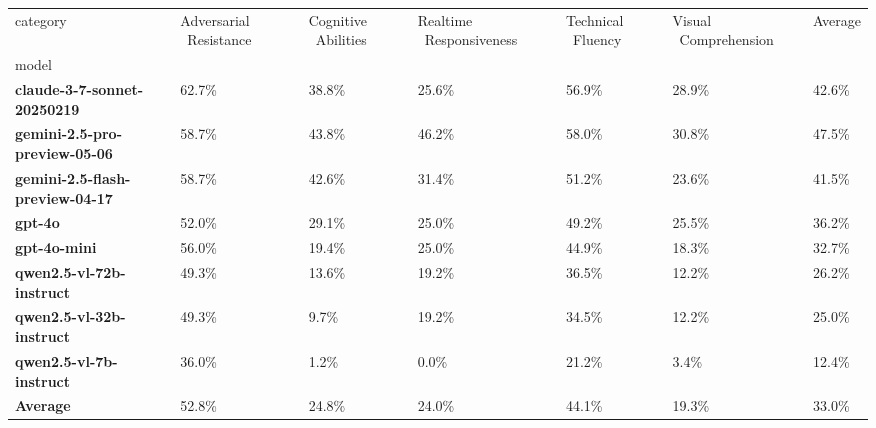 \begin{tabular}{lllllll}
\toprule
category & Adversarial \ Resistance & Cognitive \ Abilities & Realtime \ Responsiveness & Technical \ Fluency & Visual \ Comprehension & Average \\
model &  &  &  &  &  &  \\
\midrule
\textbf{claude-3-7-sonnet-20250219} & 62.7\% & 38.8\% & 25.6\% & 56.9\% & 28.9\% & 42.6\% \\
\textbf{gemini-2.5-pro-preview-05-06} & 58.7\% & 43.8\% & 46.2\% & 58.0\% & 30.8\% & 47.5\% \\
\textbf{gemini-2.5-flash-preview-04-17} & 58.7\% & 42.6\% & 31.4\% & 51.2\% & 23.6\% & 41.5\% \\
\textbf{gpt-4o} & 52.0\% & 29.1\% & 25.0\% & 49.2\% & 25.5\% & 36.2\% \\
\textbf{gpt-4o-mini} & 56.0\% & 19.4\% & 25.0\% & 44.9\% & 18.3\% & 32.7\% \\
\textbf{qwen2.5-vl-72b-instruct} & 49.3\% & 13.6\% & 19.2\% & 36.5\% & 12.2\% & 26.2\% \\
\textbf{qwen2.5-vl-32b-instruct} & 49.3\% & 9.7\% & 19.2\% & 34.5\% & 12.2\% & 25.0\% \\
\textbf{qwen2.5-vl-7b-instruct} & 36.0\% & 1.2\% & 0.0\% & 21.2\% & 3.4\% & 12.4\% \\
\textbf{Average} & 52.8\% & 24.8\% & 24.0\% & 44.1\% & 19.3\% & 33.0\% \\
\bottomrule
\end{tabular}
